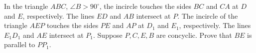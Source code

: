 In the triangle $ABC$, $\angle B>90^\circ$, the incircle touches the sides $BC$ and $CA$ at $D$ and $E$, respectively. The lines $ED$ and $AB$ intersect at $P$. The incircle of the triangle $AEP$ touches the sides $PE$ and $AP$ at $D_1$ and $E_1$, respectively. The lines $E_1D_1$ and $AE$ intersect at $P_1$. Suppose $P,C,E,B$ are concyclic. Prove that $BE$ is parallel to $PP_1$.